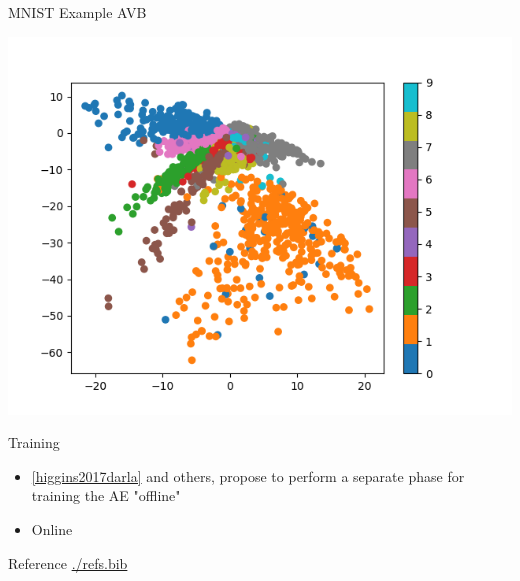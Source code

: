 \documentclass[presentation]{beamer}
\begin{document}
\begin{frame}[label={sec:orgc6b61ce}]{MNIST Example AVB}
\begin{center}
\includegraphics[width=.9\linewidth]{./avb.png}
\end{center}
\end{frame}
\begin{frame}[label={sec:org07a3a5b}]{Training}
\begin{itemize}
\item \ref{higgins2017darla} and others, propose to perform a separate
phase for training the AE "offline"
\item Online
\end{itemize}
\end{frame}

\begin{frame}[label={sec:org889a6af}]{Reference}
\url{./refs.bib}
\end{frame}
\end{document}
